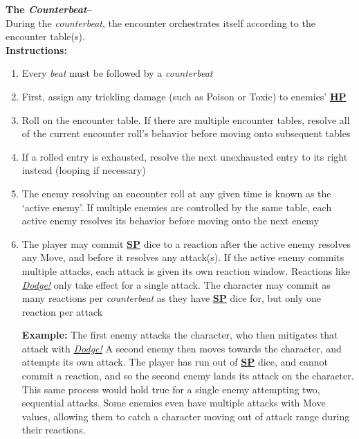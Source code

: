 \documentclass[12pt]{article}
\newcommand{\refto}[1]{\hyperlink{#1}{\textbf{#1}}}
\newcommand{\reftoit}[1]{\hyperlink{#1}{\emph{#1}}}
\begin{document}
\begin{multicols*}{2}
\textbf{The \emph{Counterbeat}--}\\
During the \emph{counterbeat}, the encounter orchestrates itself according to the encounter table(s).\\
\textbf{Instructions:}
\begin{enumerate}
\item Every \emph{beat} must be followed by a \emph{counterbeat}
\item First, assign any trickling damage (such as Poison or Toxic) to enemies’ \refto{HP}
\item Roll on the encounter table. If there are multiple encounter tables, resolve all of the current encounter roll’s behavior before moving onto subsequent tables
\item If a rolled entry is exhausted, resolve the next unexhausted entry to its right instead (looping if necessary)
\item The enemy resolving an encounter roll at any given time is known as the ‘active enemy’. If multiple enemies are controlled by the same table, each active enemy resolves its behavior before moving onto the next enemy
\item The player may commit \refto{SP} dice to a reaction after the active enemy resolves any Move, and before it resolves any attack(s). If the active enemy commits multiple attacks, each attack is given its own reaction window. Reactions like \reftoit{Dodge!} only take effect for a single attack. The character may commit as many reactions per \emph{counterbeat} as they have \refto{SP} dice for, but only one reaction per attack

\begin{tcolorbox}
\textbf{Example:} The first enemy attacks the character, who then mitigates that attack with \reftoit{Dodge!}\newline
A second enemy then moves towards the character, and attempts its own attack. The player has run out of \refto{SP} dice, and cannot commit a reaction, and so the second enemy lands its attack on the character.\newline
This same process would hold true for a single enemy attempting two, sequential attacks. Some enemies even have multiple attacks with Move values, allowing them to catch a character moving out of attack range during their reactions.
\end{tcolorbox}


\end{enumerate}
\end{multicols*}
\end{document}
